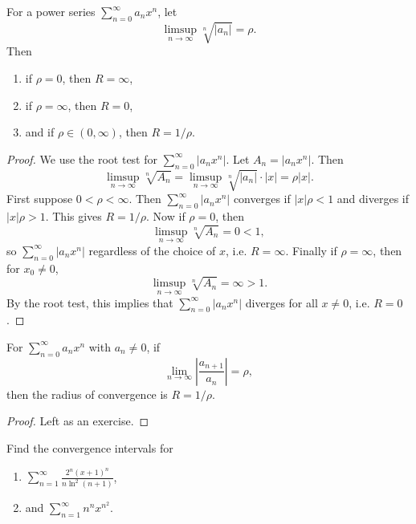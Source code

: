 \begin{theorem}
  For a power series $\sum_{n = 0}^\infty a_n x^n$, let
  \[
    \limsup_{n \to \infty} \sqrt[n]{|a_n|} = \rho.
  \]
  Then
  \begin{enumerate}
    \item if $\rho = 0$, then $R = \infty$,
    \item if $\rho = \infty$, then $R = 0$,
    \item and if $\rho \in (0, \infty)$, then $R = 1 / \rho$.
  \end{enumerate}
\end{theorem}

\begin{proof}
  We use the root test for
  $\sum_{n = 0}^\infty |a_n x^n|$. Let $A_n = |a_n x^n|$.
  Then
  \[
    \limsup_{n \to \infty} \sqrt[n]{A_n}
    = \limsup_{n \to \infty} \sqrt[n]{|a_n|} \cdot |x|
    = \rho |x|.
  \]
  First suppose $0 < \rho < \infty$. Then $\sum_{n = 0}^\infty |a_n x^n|$
  converges if $|x| \rho < 1$ and diverges if
  $|x| \rho > 1$. This gives $R = 1 / \rho$. Now
  if $\rho = 0$, then
  \[
    \limsup_{n \to \infty} \sqrt[n]{A_n} = 0 < 1,
  \]
  so $\sum_{n = 0}^\infty |a_n x^n|$ regardless of the
  choice of $x$, i.e. $R = \infty$. Finally if $\rho = \infty$, then
  for $x_0 \ne 0$,
  \[
    \limsup_{n \to \infty} \sqrt[n]{A_n} = \infty > 1.
  \]
  By the root test, this implies that $\sum_{n = 0}^\infty |a_n x^n|$
  diverges for all $x \ne 0$, i.e. $R = 0$.
\end{proof}

\begin{corollary}
  For $\sum_{n = 0}^\infty a_n x^n$ with $a_n \ne 0$,
  if
  \[
    \lim_{n \to \infty} \left|\frac{a_{n + 1}}{a_n}\right|
    = \rho,
  \]
  then the radius of convergence is $R = 1 / \rho$.
\end{corollary}

\begin{proof}
  Left as an exercise.
\end{proof}

\begin{example}
  Find the convergence intervals for
  \begin{enumerate}
    \item $\displaystyle \sum_{n = 1}^\infty \frac{2^n(x + 1)^n}{n \ln^2(n + 1)}$,
    \item and $\displaystyle \sum_{n = 1}^\infty n^n x^{n^2}$.
  \end{enumerate}
\end{example}

